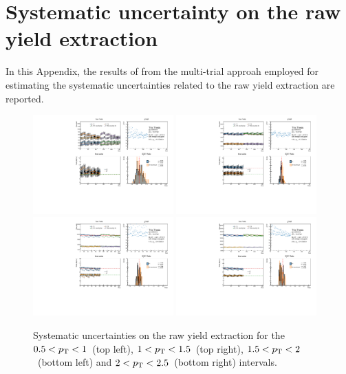\chapter{Systematic uncertainty on the raw yield extraction}
In this Appendix, the results of from the multi-trial approah employed for estimating the systematic uncertainties related to the raw yield extraction are reported.

\begin{figure}
    \centering
    \includegraphics[width=0.48\textwidth]{Figures/Chapter 5/AllPtBins/RawYieldSyst0.5_1.pdf}
    \includegraphics[width=0.48\textwidth]{Figures/Chapter 5/AllPtBins/RawYieldSyst1_1.5.pdf}
    \includegraphics[width=0.48\textwidth]{Figures/Chapter 5/AllPtBins/RawYieldSyst1.5_2.pdf}
    \includegraphics[width=0.48\textwidth]{Figures/Chapter 5/AllPtBins/RawYieldSyst2_2.5.pdf}
    \caption{Systematic uncertainties on the raw yield extraction for the $0.5 < p_\mathrm{T} < 1$~\gevc (top left), $1 < p_\mathrm{T} < 1.5$~\gevc (top right), $1.5 < p_\mathrm{T} < 2$~\gevc (bottom left) and $2 < p_\mathrm{T} < 2.5$~\gevc (bottom right) intervals.}
\end{figure}


